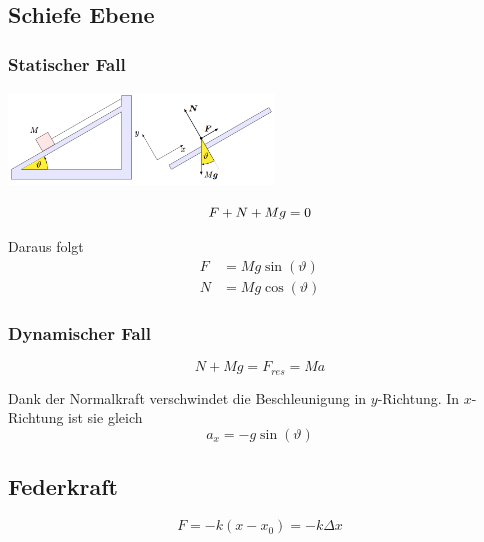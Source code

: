 \documentclass[7pt]{article}
\begin{document}
\begin{multicols*}{3}
\subsection{Schiefe Ebene}

\subsubsection{Statischer Fall}

\begin{center}
	\includegraphics[width=200pt]{images/schiefe_ebene}
\end{center}

\begin{equation*}
	F + N + Mg = 0\\
\end{equation*}

Daraus folgt
\begin{equation*}
\begin{split}
	F & = Mg\sin(\vartheta)\\
	N & = Mg\cos(\vartheta)
\end{split}
\end{equation*}

\subsubsection{Dynamischer Fall}

\begin{equation*}
	N + Mg = F_{res} = Ma
\end{equation*}

Dank der Normalkraft verschwindet die Beschleunigung in $y$-Richtung.
In $x$-Richtung ist sie gleich
\begin{equation*}
	a_x = -g\sin(\vartheta)
\end{equation*}

\subsection{Federkraft}

\begin{equation*}
	F = -k(x-x_0) = -k\Delta x
\end{equation*}


\end{multicols*}
\end{document}
